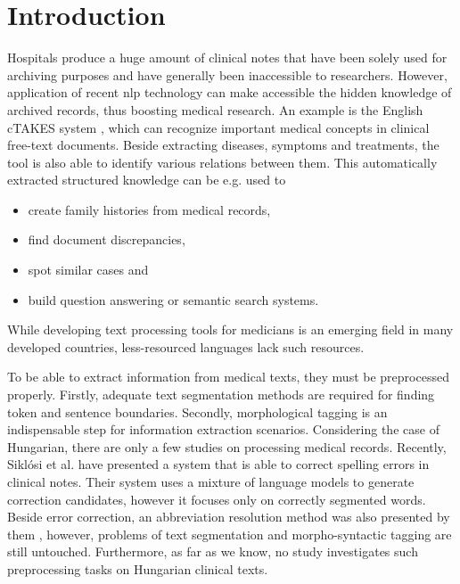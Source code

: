 
\section{Introduction}

Hospitals produce a huge amount of clinical notes that have been solely used for archiving purposes and have generally been inaccessible to researchers. 
However, application of recent \acrshort{nlp} technology can make accessible the hidden knowledge of archived records, thus boosting medical research. 
An example is the English cTAKES system \cite{Savova2010}, which can recognize important medical concepts in clinical free-text documents. 
Beside extracting diseases, symptoms and treatments, the tool is also able to identify various relations between them.
This automatically extracted structured knowledge can be e.g. used to 
\begin{itemize}
	\item create family histories from medical records,
	\item find document discrepancies,
	\item spot similar cases and
	\item build question answering or semantic search systems.
\end{itemize}
While developing text processing tools for medicians is an emerging field in many developed countries, less-resourced languages lack such resources.

To be able to extract information from medical texts, they must be preprocessed properly. 
Firstly, adequate text segmentation methods 
are required for finding token and sentence boundaries. 
Secondly, morphological tagging is an indispensable step for information extraction scenarios. 
Considering the case of Hungarian, there are only a few studies on processing medical records. 
Recently, Siklósi et al. \cite{Siklosi2012,Siklosi2013} have presented a system that is able to correct spelling errors in clinical notes. 
Their system uses a mixture of language models to generate correction candidates, however it focuses only on correctly segmented words. 
Beside error correction, an abbreviation resolution method was also presented by them \cite{Siklosi2013b}, however, problems of text segmentation and  morpho-syntactic tagging are still untouched. 
Furthermore, as far as we know, no study investigates such preprocessing tasks on Hungarian clinical texts. 

